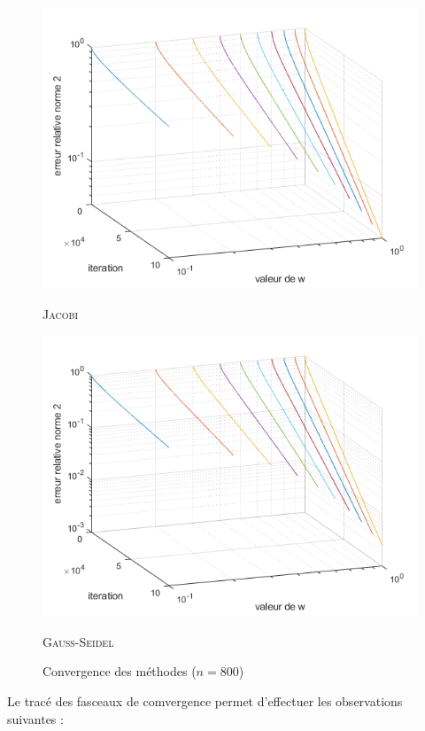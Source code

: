 \documentclass[12pt]{report}
\begin{document}
\begin{figure}[H]
\begin{minipage}{0.5\textwidth}
\includegraphics[scale = 0.63]{j_i_w_2.png}
\caption{\textsc{Jacobi}}
\end{minipage}
\begin{minipage}{0.499\textwidth}
\includegraphics[scale = 0.63]{gs_i_w_2.png}
\caption{ \textsc{Gauss-Seidel}}
\end{minipage}
\caption{Convergence des méthodes ($n = 800$)}
\end{figure}

Le tracé des fasceaux de comvergence permet d'effectuer les observations suivantes :
\end{document}
